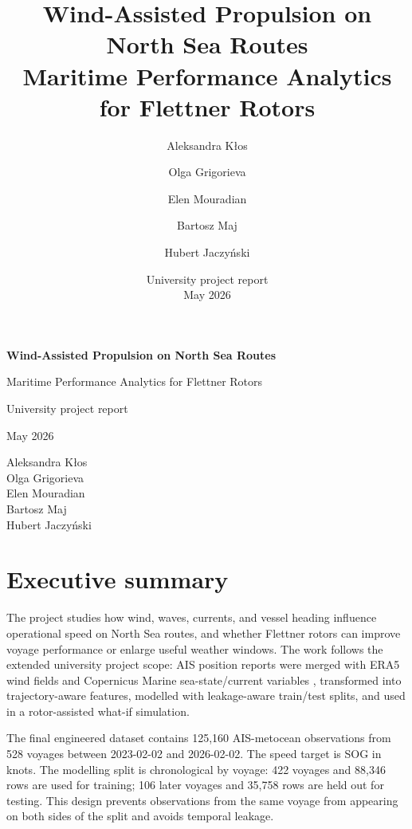 \documentclass[10pt,a4paper]{article}
\title{\textbf{Wind-Assisted Propulsion on North Sea Routes}\\
\large Maritime Performance Analytics for Flettner Rotors}
\author{Aleksandra K\l{}os \and Olga Grigorieva \and Elen Mouradian \and Bartosz Maj \and Hubert Jaczy\'nski}
\date{University project report \\
May 2026}
\newcommand{\sog}{SOG}
\begin{document}

\begin{titlepage}
    \centering
    \vspace*{1.2cm}
    {\Huge\bfseries Wind-Assisted Propulsion on North Sea Routes\par}
    \vspace{0.35cm}
    {\Large Maritime Performance Analytics for Flettner Rotors\par}
    \vspace{0.9cm}
    {\large University project report\par}
    \vspace{0.25cm}
    {\large May 2026\par}
    \vspace{1.2cm}
    {\large
    Aleksandra K\l{}os\\
    Olga Grigorieva\\
    Elen Mouradian\\
    Bartosz Maj\\
    Hubert Jaczy\'nski\par}
\end{titlepage}

\tableofcontents
\clearpage

\section{Executive summary}

The project studies how wind, waves, currents, and vessel heading influence
operational speed on North Sea routes, and whether Flettner rotors can improve
voyage performance or enlarge useful weather windows. The work follows the
extended university project scope: AIS position reports were merged with ERA5
wind fields and Copernicus Marine sea-state/current variables
\cite{hersbach2020era5,copernicusmarine}, transformed into trajectory-aware
features, modelled with leakage-aware train/test splits, and used in a
rotor-assisted what-if simulation.

The final engineered dataset contains 125,160 AIS-metocean observations from
528 voyages between 2023-02-02 and 2026-02-02. The speed target is
\sog{} in knots. The modelling split is chronological by voyage: 422 voyages
and 88,346 rows are used for training; 106 later voyages and 35,758 rows are
held out for testing. This design prevents observations from the same voyage
from appearing on both sides of the split and avoids temporal leakage.
\end{document}
